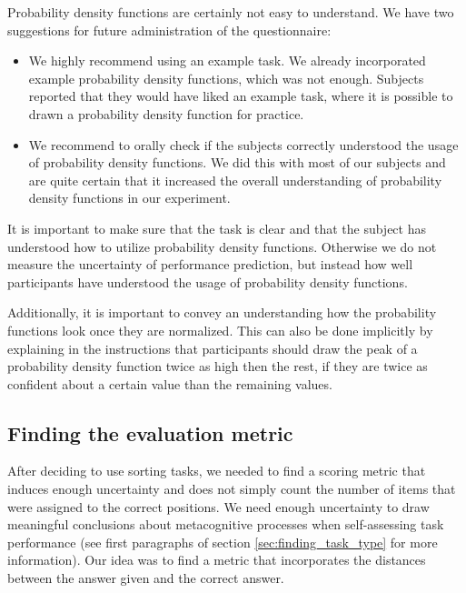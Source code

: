 \documentclass[../main/main.tex]{subfiles}
\begin{document}
	Probability density functions are certainly not easy to understand. We have two suggestions for future administration of the questionnaire:
	
	\begin{itemize}
		\item We highly recommend using an example task. We already incorporated example probability density functions, which was not enough. Subjects reported that they would have liked an example task, where it is possible to drawn a probability density function for practice.
		\item We recommend to orally check if the subjects correctly understood the usage of probability density functions. We did this with most of our subjects and are quite certain that it increased the overall understanding of probability density functions in our experiment.
	\end{itemize}
	
	\noindent It is important to make sure that the task is clear and that the subject has understood how to utilize probability density functions. Otherwise we do not measure the uncertainty of performance prediction, but instead how well participants have understood the usage of probability density functions.
	
	Additionally, it is important to convey an understanding how the probability functions look once they are normalized. This can also be done implicitly by explaining in the instructions that participants should draw the peak of a probability density function twice as high then the rest, if they are twice as confident about a certain value than the remaining values.
	
	\subsection{Finding the evaluation metric}
	\label{sec:finding_metric}
	
	After deciding to use sorting tasks, we needed to find a scoring metric that induces enough uncertainty and does not simply count the number of items that were assigned to the correct positions. We need enough uncertainty to draw meaningful conclusions about metacognitive processes when self-assessing task performance (see first paragraphs of section \ref{sec:finding_task_type} for more information). Our idea was to find a metric that incorporates the distances between the answer given and the correct answer.
	
\end{document}
